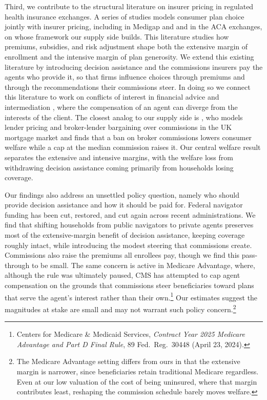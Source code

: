\documentclass[12pt]{article}
\begin{document}
Third, we contribute to the structural literature on insurer pricing in regulated health insurance exchanges. A series of studies models consumer plan choice jointly with insurer pricing, including \cite{starc2014} in Medigap and \cite{tebaldi2025} and \cite{saltzman2019, saltzman2021} in the ACA exchanges, on whose framework our supply side builds. This literature studies how premiums, subsidies, and risk adjustment shape both the extensive margin of enrollment and the intensive margin of plan generosity. We extend this existing literature by introducing decision assistance and the commissions insurers pay the agents who provide it, so that firms influence choices through premiums and through the recommendations their commissions steer. In doing so we connect this literature to work on conflicts of interest in financial advice and intermediation \citep{egan2019, guiso2022}, where the compensation of an agent can diverge from the interests of the client. The closest analog to our supply side is \cite{roblesgarcia2020}, who models lender pricing and broker-lender bargaining over commissions in the UK mortgage market and finds that a ban on broker commissions lowers consumer welfare while a cap at the median commission raises it. Our central welfare result separates the extensive and intensive margins, with the welfare loss from withdrawing decision assistance coming primarily from households losing coverage.

Our findings also address an unsettled policy question, namely who should provide decision assistance and how it should be paid for. Federal navigator funding has been cut, restored, and cut again across recent administrations. We find that shifting households from public navigators to private agents preserves most of the extensive-margin benefit of decision assistance, keeping coverage roughly intact, while introducing the modest steering that commissions create. Commissions also raise the premiums all enrollees pay, though we find this pass-through to be small. The same concern is active in Medicare Advantage, where, although the rule was ultimately paused, CMS has attempted to cap agent compensation on the grounds that commissions steer beneficiaries toward plans that serve the agent's interest rather than their own.\footnote{Centers for Medicare \& Medicaid Services, \textit{Contract Year 2025 Medicare Advantage and Part D Final Rule}, 89 Fed.\ Reg.\ 30448 (April 23, 2024).} Our estimates suggest the magnitudes at stake are small and may not warrant such policy concern.\footnote{The Medicare Advantage setting differs from ours in that the extensive margin is narrower, since beneficiaries retain traditional Medicare regardless. Even at our low valuation of the cost of being uninsured, where that margin contributes least, reshaping the commission schedule barely moves welfare.}
\end{document}
